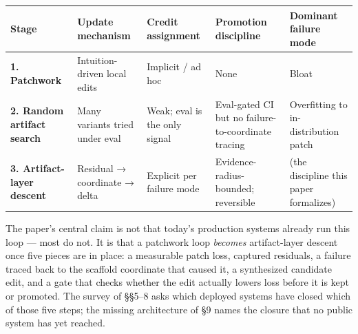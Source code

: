 \documentclass[
]{article}
\newcounter{none} %
\begin{document}
{\def\LTcaptype{none} %
\begin{longtable}[]{@{}
  >{\raggedright\arraybackslash}p{}
  >{\raggedright\arraybackslash}p{}
  >{\raggedright\arraybackslash}p{}
  >{\raggedright\arraybackslash}p{}
  >{\raggedright\arraybackslash}p{}@{}}
\toprule\noalign{}
\begin{minipage}[b]{\linewidth}\raggedright
Stage
\end{minipage} & \begin{minipage}[b]{\linewidth}\raggedright
Update mechanism
\end{minipage} & \begin{minipage}[b]{\linewidth}\raggedright
Credit assignment
\end{minipage} & \begin{minipage}[b]{\linewidth}\raggedright
Promotion discipline
\end{minipage} & \begin{minipage}[b]{\linewidth}\raggedright
Dominant failure mode
\end{minipage} \\
\midrule\noalign{}
\endhead
\bottomrule\noalign{}
\endlastfoot
\textbf{1. Patchwork} & Intuition-driven local edits & Implicit / ad hoc
& None & Bloat \\
\textbf{2. Random artifact search} & Many variants tried under eval &
Weak; eval is the only signal & Eval-gated CI but no
failure-to-coordinate tracing & Overfitting to in-distribution patch \\
\textbf{3. Artifact-layer descent} & Residual → coordinate → delta &
Explicit per failure mode & Evidence-radius-bounded; reversible & (the
discipline this paper formalizes) \\
\end{longtable}
}

The paper's central claim is not that today's production systems already
run this loop --- most do not. It is that a patchwork loop
\emph{becomes} artifact-layer descent once five pieces are in place: a
measurable patch loss, captured residuals, a failure traced back to the
scaffold coordinate that caused it, a synthesized candidate edit, and a
gate that checks whether the edit actually lowers loss before it is kept
or promoted. The survey of §§5--8 asks which deployed systems have
closed which of those five steps; the missing architecture of §9 names
the closure that no public system has yet reached.
\end{document}
